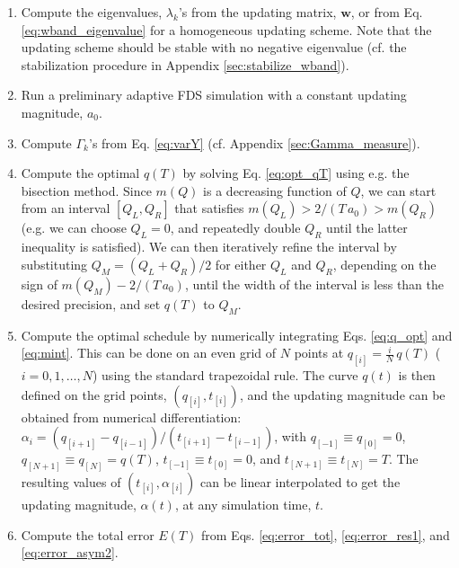 \documentclass[reprint, superscriptaddress, floatfix]{revtex4-1}
\newcommand{\Err}{E}
\begin{document}
\begin{enumerate}

\item
Compute the eigenvalues, $\lambda_k$'s
from the updating matrix, $\mathbf w$,
or from Eq. \eqref{eq:wband_eigenvalue}
for a homogeneous updating scheme.
%
Note that
the updating scheme should be stable
with no negative eigenvalue
(cf. the stabilization procedure in Appendix \ref{sec:stabilize_wband}).

\item
Run a preliminary adaptive FDS simulation
with a constant updating magnitude, $a_0$.

\item
Compute $\Gamma_k$'s from Eq. \eqref{eq:varY}
    (cf. Appendix \ref{sec:Gamma_measure}).

\item
Compute the optimal $q(T)$ by solving Eq. \eqref{eq:opt_qT}
using e.g. the bisection method.
%
Since $m(Q)$ is a decreasing function of $Q$,
we can start from an interval $[Q_L, Q_R]$
that satisfies $m(Q_L) > 2/(T\,a_0) > m(Q_R)$
(e.g. we can choose $Q_L = 0$,
  and repeatedly double $Q_R$ until
  the latter inequality is satisfied).
%
We can then iteratively refine the interval
by substituting $Q_M = (Q_L + Q_R)/2$
for either $Q_L$ and $Q_R$,
depending on the sign of $m(Q_M) - 2/(T \, a_0)$,
until the width of the interval is less than
the desired precision,
%
and set $q(T)$ to $Q_M$.

\item
Compute the optimal schedule by
numerically integrating Eqs. \eqref{eq:q_opt} and \eqref{eq:mint}.
%
This can be done on an even grid of $N$ points
at $q_{[i]} = \frac{i}{N} \, q(T)$
($i = 0, 1, \dots, N$)
using the standard trapezoidal rule\cite{press3rd}.
%
The curve $q(t)$ is then defined on the grid points,
$(q_{[i]}, t_{[i]})$,
%
and the updating magnitude can be obtained from numerical differentiation:
$\alpha_i = (q_{[i+1]} - q_{[i-1]}) / (t_{[i+1]} - t_{[i-1]})$,
with
$q_{[ -1]} \equiv q_{[0]} = 0$,
$q_{[N+1]} \equiv q_{[N]} = q(T)$,
$t_{[ -1]} \equiv t_{[0]} = 0$, and
$t_{[N+1]} \equiv t_{[N]} = T$.
%
The resulting values of $(t_{[i]}, \alpha_{[i]})$
can be linear interpolated
to get the updating magnitude, $\alpha(t)$, at any simulation time, $t$.

\item
  Compute the total error $\Err(T)$ from
Eqs. \eqref{eq:error_tot},
  \eqref{eq:error_res1},
  and
  \eqref{eq:error_asym2}.

\end{enumerate}
\end{document}
